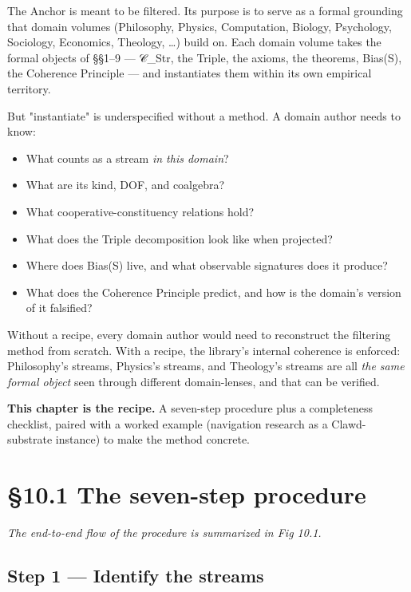 \documentclass[11pt, openany]{book}
\newcommand{\sectionbreak}{\clearpage}
\begin{document}
The Anchor is meant to be filtered. Its purpose is to serve as a formal grounding that domain volumes (Philosophy, Physics, Computation, Biology, Psychology, Sociology, Economics, Theology, …) build on. Each domain volume takes the formal objects of §§1–9 --- 𝒞\_\allowbreak{}Str, the Triple, the axioms, the theorems, Bias(S), the Coherence Principle --- and instantiates them within its own empirical territory.

But "instantiate" is underspecified without a method. A domain author needs to know:

\begin{itemize}
\item What counts as a stream \textit{in this domain}?
\item What are its kind, DOF, and coalgebra?
\item What cooperative-constituency relations hold?
\item What does the Triple decomposition look like when projected?
\item Where does Bias(S) live, and what observable signatures does it produce?
\item What does the Coherence Principle predict, and how is the domain's version of it falsified?
\end{itemize}

Without a recipe, every domain author would need to reconstruct the filtering method from scratch. With a recipe, the library's internal coherence is enforced: Philosophy's streams, Physics's streams, and Theology's streams are all \textit{the same formal object} seen through different domain-lenses, and that can be verified.

\textbf{This chapter is the recipe.} A seven-step procedure plus a completeness checklist, paired with a worked example (navigation research as a Clawd-substrate instance) to make the method concrete.

\sectionbreak

\section{§10.1 The seven-step procedure}

\textit{The end-to-end flow of the procedure is summarized in Fig 10.1.}

\subsection{Step 1 --- Identify the streams}
\end{document}
